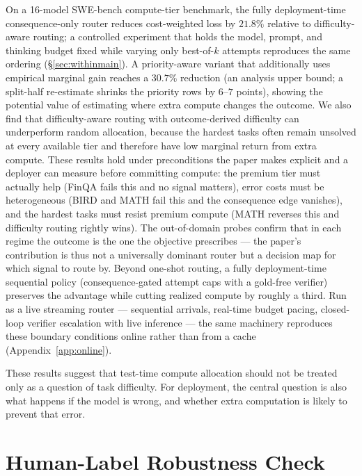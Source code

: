 \documentclass{article}
\begin{document}
On a 16-model SWE-bench compute-tier benchmark, the fully
deployment-time consequence-only router reduces cost-weighted loss by
$21.8\%$ relative to difficulty-aware routing; a controlled experiment
that holds the model, prompt, and thinking budget fixed while varying
only best-of-$k$ attempts reproduces the same ordering
(\S\ref{sec:withinmain}). A priority-aware
variant that additionally uses empirical marginal gain reaches a
$30.7\%$ reduction (an analysis upper bound; a split-half
re-estimate shrinks the priority rows by $6$--$7$ points), showing the potential
value of estimating where extra compute changes the outcome.
We also find that difficulty-aware routing with outcome-derived
difficulty can underperform random allocation, because the hardest
tasks often remain unsolved at every available tier and therefore
have low marginal return from extra compute. These results hold
under preconditions the paper makes explicit and a deployer can
measure before committing compute: the premium tier must actually
help (FinQA fails this and no signal matters), error costs must be
heterogeneous (BIRD and MATH fail this and the consequence edge
vanishes), and the hardest tasks must resist premium compute (MATH
reverses this and difficulty routing rightly wins). The out-of-domain
probes confirm that in each regime the outcome is the one the
objective prescribes --- the paper's contribution is thus not a
universally dominant router but a decision map for which signal to
route by. Beyond one-shot routing, a fully
deployment-time sequential policy (consequence-gated attempt caps
with a gold-free verifier) preserves the advantage while cutting
realized compute by roughly a third. Run as a live streaming router
--- sequential arrivals, real-time budget pacing, closed-loop
verifier escalation with live inference --- the same machinery
reproduces these boundary conditions online rather than from a cache
(Appendix~\ref{app:online}).

These results suggest that test-time compute allocation should not be
treated only as a question of task difficulty. For deployment, the
central question is also what happens if the model is wrong, and
whether extra computation is likely to prevent that error.




\appendix

\section{Human-Label Robustness Check}
\label{app:iaa}
\end{document}
